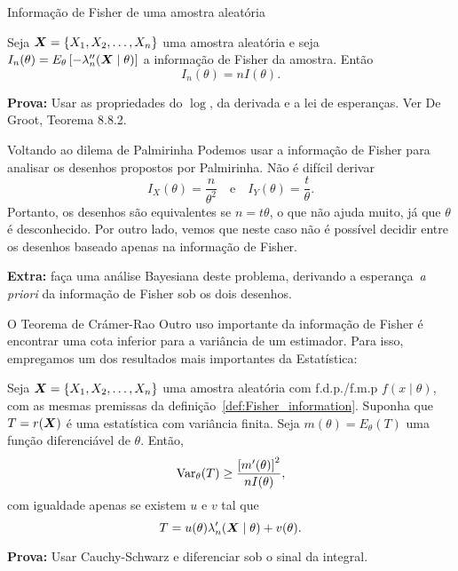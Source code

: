 \begin{frame}{Informação de Fisher de uma amostra aleatória}

\begin{theo}
 \label{thm:Fisher_information_random_sample}
 Seja $\boldsymbol{X} = \{ X_1, X_2, \ldots, X_n \}$ uma amostra aleatória e seja $I_n(\theta) = E_\theta \left[-\lambda_n^{\prime\prime}(\boldsymbol{X} \mid \theta) \right]$ a informação de Fisher da amostra.
 Então
 \begin{equation*}
  I_n(\theta) = nI(\theta).
 \end{equation*} 
\end{theo}
\textbf{Prova:} Usar as propriedades do $\log$, da derivada e a lei de esperanças.
Ver De Groot, Teorema 8.8.2.
\end{frame}

\begin{frame}{Voltando ao dilema de Palmirinha}
Podemos usar a informação de Fisher para analisar os desenhos propostos por Palmirinha.
Não é difícil derivar
\begin{equation*}
 I_X(\theta) = \frac{n}{\theta^2}\quad\text{e}\quad I_Y(\theta) = \frac{t}{\theta}.
\end{equation*}
Portanto, os desenhos são equivalentes se $n = t\theta$, o que não ajuda muito, já que $\theta$ é desconhecido.
Por outro lado, vemos que neste caso não é possível decidir entre os desenhos baseado apenas na informação de Fisher.

\textbf{Extra:} faça uma análise Bayesiana deste problema, derivando a esperança~\textit{a priori} da informação de Fisher sob os dois desenhos.
 \end{frame}

 \begin{frame}{O Teorema de Crámer-Rao}
Outro uso importante da informação de Fisher é encontrar uma cota inferior para a variância de um estimador.
Para isso, empregamos um dos resultados mais importantes da Estatística:
\begin{theo}
 \label{thm:Cramer_Rao_theorem}
 Seja $\boldsymbol{X} = \{ X_1, X_2, \ldots, X_n \}$ uma amostra aleatória com f.d.p./f.m.p $f(x\mid\theta)$, com as mesmas premissas da definição~\ref{def:Fisher_information}.
 Suponha que $T = r(\boldsymbol{X})$ é uma estatística com variância finita.
 Seja $m(\theta) = E_\theta(T)$ uma função diferenciável de $\theta$.
 Então,
 \begin{equation}
  \label{eq:Cramer_Rao_theorem}
  \operatorname{Var}_\theta(T) \geq \frac{\left[m^\prime(\theta)\right]^2}{nI(\theta)},
 \end{equation}
 com igualdade apenas se existem $u$ e $v$ tal que 
 \[ T = u(\theta)\lambda_n^\prime(\boldsymbol{X} \mid \theta) + v(\theta). \]
\end{theo}
\textbf{Prova:} Usar Cauchy-Schwarz e diferenciar sob o sinal da integral.
\end{frame}

